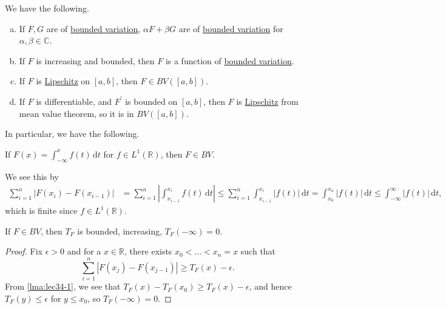 \begin{remark}
	We have the following.
	\begin{enumerate}[(a)]
		\item If \(F,G\) are of \hyperref[def:bounded-variation]{bounded variation}, \(\alpha F + \beta G\) are of \hyperref[def:bounded-variation]{bounded variation}
		      for \(\alpha , \beta \in \mathbb{C} \).
		\item If \(F\) is increasing and bounded, then \(F\) is a function of \hyperref[def:bounded-variation]{bounded variation}.
		\item If \(F\) is \hyperref[def:Lipschitz]{Lipschitz} on \([a,b]\), then \(F \in BV([a,b])\).
		\item If \(F\) is differentiable, and \(F^\prime\) is bounded on \([a,b]\), then \(F\) is \hyperref[def:Lipschitz]{Lipschitz} from mean value theorem,
		      so it is in \(BV([a,b])\).
	\end{enumerate}
\end{remark}

In particular, we have the following.
\begin{remark}
	If \(F(x) = \int_{-\infty}^x f(t) \,\mathrm{d} t\) for \(f \in L^1(\mathbb{R})\), then \(F \in BV\).
\end{remark}
\begin{explanation}
	We see this by
	\[
		\begin{split}
			\sum_{i=1}^n \left\vert F(x_i) - F(x_{i-1}) \right\vert & = \sum_{i=1}^n \left\vert \int_{x_{i-1}}^{x_i} f(t) \,\mathrm{d} t \right\vert
			\leq \sum_{i=1}^n \int_{x_{i-1}}^{x_i} \left\vert f(t) \right\vert \,\mathrm{d} t
			= \int_{x_0}^{x_n} \left\vert f(t) \right\vert \,\mathrm{d} t
			\leq \int_{-\infty}^\infty \left\vert f(t) \right\vert \,\mathrm{d} t,
		\end{split}
	\]
	which is finite since \(f\in L^1(\mathbb{R} )\).
\end{explanation}

\begin{lemma}\label{lma:lec34-2}
	If \(F \in BV\), then \(T_F\) is bounded, increasing, \(T_F(-\infty) = 0\).
\end{lemma}
\begin{proof}
	Fix \(\epsilon > 0\) and for a \(x\in \mathbb{R} \), there exists \(x_0 < \dots < x_n = x \) such that
	\[
		\sum_{i=1}^{n} \left\vert F(x_{j} ) - F(x_{j-1})\right\vert \geq T_{F} (x) - \epsilon.
	\]
	From \autoref{lma:lec34-1}, we see that \(T_{F} (x) - T_{F} (x_0) \geq T_{F} (x) - \epsilon \), and hence
	\(T_{F} (y) \leq \epsilon \) for \(y\leq x_0\), so \(T_{F} (-\infty ) = 0\).
\end{proof}

